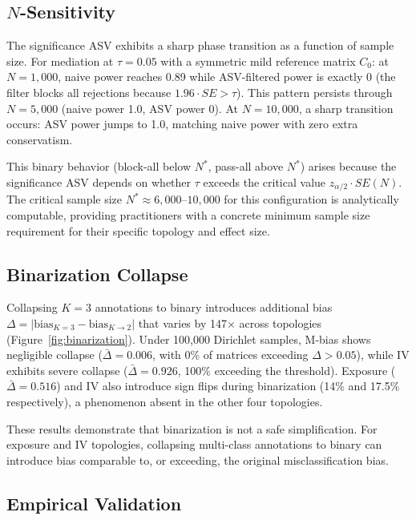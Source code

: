 \subsection{$N$-Sensitivity}
\label{sec:n_sensitivity}

The significance ASV exhibits a sharp phase transition as a function of sample size. For mediation at $\tau{=}0.05$ with a symmetric mild reference matrix $C_0$: at $N{=}1{,}000$, naive power reaches 0.89 while ASV-filtered power is exactly 0 (the filter blocks all rejections because $1.96 \cdot SE > \tau$). This pattern persists through $N{=}5{,}000$ (naive power 1.0, ASV power 0). At $N{=}10{,}000$, a sharp transition occurs: ASV power jumps to 1.0, matching naive power with zero extra conservatism.

This binary behavior (block-all below $N^*$, pass-all above $N^*$) arises because the significance ASV depends on whether $\tau$ exceeds the critical value $z_{\alpha/2} \cdot SE(N)$. The critical sample size $N^* \approx 6{,}000$--$10{,}000$ for this configuration is analytically computable, providing practitioners with a concrete minimum sample size requirement for their specific topology and effect size.

\subsection{Binarization Collapse}
\label{sec:binarization}

Collapsing $K{=}3$ annotations to binary introduces additional bias $\Delta = |\text{bias}_{K=3} - \text{bias}_{K \to 2}|$ that varies by 147$\times$ across topologies (Figure~\ref{fig:binarization}). Under 100{,}000 Dirichlet samples, M-bias shows negligible collapse ($\bar{\Delta}{=}0.006$, with 0\% of matrices exceeding $\Delta{>}0.05$), while IV exhibits severe collapse ($\bar{\Delta}{=}0.926$, 100\% exceeding the threshold). Exposure ($\bar{\Delta}{=}0.516$) and IV also introduce sign flips during binarization (14\% and 17.5\% respectively), a phenomenon absent in the other four topologies.

These results demonstrate that binarization is not a safe simplification. For exposure and IV topologies, collapsing multi-class annotations to binary can introduce bias comparable to, or exceeding, the original misclassification bias.

\subsection{Empirical Validation}
\label{sec:empirical}

